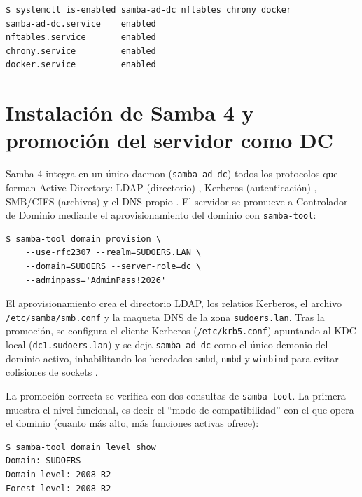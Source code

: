\begin{lstlisting}[style=terminal]
$ systemctl is-enabled samba-ad-dc nftables chrony docker
samba-ad-dc.service    enabled
nftables.service       enabled
chrony.service         enabled
docker.service         enabled
\end{lstlisting}


\section{Instalación de Samba 4 y promoción del servidor como DC}

Samba 4 integra en un único daemon (\texttt{samba-ad-dc}) todos los
protocolos que forman Active Directory: LDAP (directorio) \citep{rfc4511},
Kerberos (autenticación) \citep{rfc4120}, SMB/CIFS (archivos) y el DNS
propio \citep{sambateam2024}. El servidor se promueve a Controlador de
Dominio mediante el aprovisionamiento del dominio con \texttt{samba-tool}:

\begin{lstlisting}[style=terminal]
$ samba-tool domain provision \
    --use-rfc2307 --realm=SUDOERS.LAN \
    --domain=SUDOERS --server-role=dc \
    --adminpass='AdminPass!2026'
\end{lstlisting}

El aprovisionamiento crea el directorio LDAP, los relatios Kerberos, el
archivo \texttt{/etc/samba/smb.conf} y la maqueta DNS de la zona
\texttt{sudoers.lan}. Tras la promoción, se configura el cliente Kerberos
(\texttt{/etc/krb5.conf}) apuntando al KDC local (\texttt{dc1.sudoers.lan})
y se deja \texttt{samba-ad-dc} como el único demonio del dominio activo,
inhabilitando los heredados \texttt{smbd}, \texttt{nmbd} y \texttt{winbind}
para evitar colisiones de sockets \citep{sambateam2024}.

La promoción correcta se verifica con dos consultas de
\texttt{samba-tool}. La primera muestra el nivel funcional, es decir el
``modo de compatibilidad'' con el que opera el dominio (cuanto más alto,
más funciones activas ofrece):

\begin{lstlisting}[style=terminal]
$ samba-tool domain level show
Domain: SUDOERS
Domain level: 2008 R2
Forest level: 2008 R2
\end{lstlisting}

